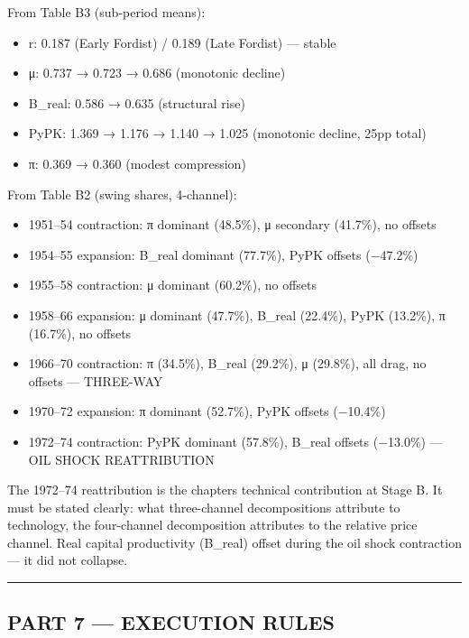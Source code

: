 From Table B3 (sub-period means):

\begin{itemize}
\tightlist
\item
  r: 0.187 (Early Fordist) / 0.189 (Late Fordist) --- stable
\item
  μ: 0.737 → 0.723 → 0.686 (monotonic decline)
\item
  B\_real: 0.586 → 0.635 (structural rise)
\item
  PyPK: 1.369 → 1.176 → 1.140 → 1.025 (monotonic decline, 25pp total)
\item
  π: 0.369 → 0.360 (modest compression)
\end{itemize}

From Table B2 (swing shares, 4-channel):

\begin{itemize}
\tightlist
\item
  1951--54 contraction: π dominant (48.5\%), μ secondary (41.7\%), no
  offsets
\item
  1954--55 expansion: B\_real dominant (77.7\%), PyPK offsets (−47.2\%)
\item
  1955--58 contraction: μ dominant (60.2\%), no offsets
\item
  1958--66 expansion: μ dominant (47.7\%), B\_real (22.4\%), PyPK
  (13.2\%), π (16.7\%), no offsets
\item
  1966--70 contraction: π (34.5\%), B\_real (29.2\%), μ (29.8\%), all
  drag, no offsets --- THREE-WAY
\item
  1970--72 expansion: π dominant (52.7\%), PyPK offsets (−10.4\%)
\item
  1972--74 contraction: PyPK dominant (57.8\%), B\_real offsets
  (−13.0\%) --- OIL SHOCK REATTRIBUTION
\end{itemize}

The 1972--74 reattribution is the chapter\textquotesingle s technical
contribution at Stage B. It must be stated clearly: what three-channel
decompositions attribute to technology, the four-channel decomposition
attributes to the relative price channel. Real capital productivity
(B\_real) offset during the oil shock contraction --- it did not
collapse.

\begin{center}\rule{0.5\linewidth}{0.5pt}\end{center}

\subsection{PART 7 --- EXECUTION RULES}\label{part-7--execution-rules}

